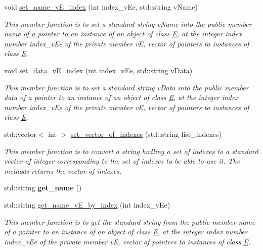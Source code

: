 \begin{DoxyCompactItemize}
void \hyperlink{group__group__set_ga83e581aaca6f1412ff4d29c96e877256}{set\+\_\+name\+\_\+v\+E\+\_\+index} (int index\+\_\+v\+Ee, std\+::string v\+Name)
\begin{DoxyCompactList}\small\item\em This member function is to set a standard string v\+Name into the public member \textquotesingle{}name\textquotesingle{} of a pointer to an instance of an object of class \hyperlink{classE}{E}, at the integer index number index\+\_\+v\+Ee of the private member vE, vector of pointers to instances of class \hyperlink{classE}{E}. \end{DoxyCompactList}\item 
void \hyperlink{group__group__set_gab1aa1d0fd0461dd61e4b5e9d39f08509}{set\+\_\+data\+\_\+v\+E\+\_\+index} (int index\+\_\+v\+Ee, std\+::string v\+Data)
\begin{DoxyCompactList}\small\item\em This member function is to set a standard string v\+Data into the public member \textquotesingle{}data\textquotesingle{} of a pointer to an instance of an object of class \hyperlink{classE}{E}, at the integer index number index\+\_\+v\+Ee of the private member vE, vector of pointers to instances of class \hyperlink{classE}{E}. \end{DoxyCompactList}\item 
std\+::vector$<$ int $>$ \hyperlink{group__group__set_ga3d23a22d991a4525a329216ebd187b98}{set\+\_\+vector\+\_\+of\+\_\+indexes} (std\+::string list\+\_\+indexes)
\begin{DoxyCompactList}\small\item\em This member function is to convert a string hodling a set of indexes to a standard vector of integer corresponding to the set of indexes to be able to use it. The methods returns the vector of indexes. \end{DoxyCompactList}\item 
std\+::string {\bfseries get\+\_\+name} ()
\item 
std\+::string \hyperlink{group__group__get_gac39a54fb84f62a7ae22119ed57553b7a}{get\+\_\+name\+\_\+v\+E\+\_\+by\+\_\+index} (int index\+\_\+v\+Ee)
\begin{DoxyCompactList}\small\item\em This member function is to get the standard string from the public member \textquotesingle{}name\textquotesingle{} of a pointer to an instance of an object of class \hyperlink{classE}{E}, at the integer index number index\+\_\+v\+Ee of the private member vE, vector of pointers to instances of class \hyperlink{classE}{E}. \end{DoxyCompactList}\item 

\end{DoxyCompactItemize}
